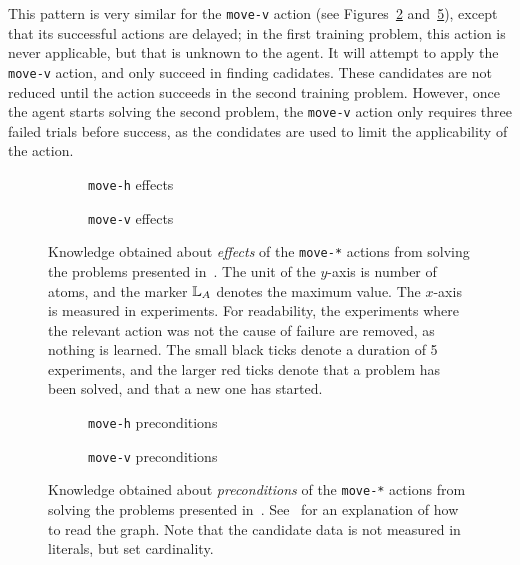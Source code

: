 \documentclass[../Master.tex]{subfiles}
\providecommand{\master}{..}
\begin{document}
This pattern is very similar for the \texttt{move-v} action (see Figures~\ref{fig:res:ekmovev} and~\ref{fig:res:pkmovev}), except that its successful actions are delayed; in the first training problem, this action is never applicable, but that is unknown to the agent. It will attempt to apply the \texttt{move-v} action, and only succeed in finding cadidates. These candidates are not reduced until the action succeeds in the second training problem. However, once the agent starts solving the second problem, the \texttt{move-v} action only requires three failed trials before success, as the condidates are used to limit the applicability of the action.

\begin{figure}
    \centering
    \begin{subfigure}{0.45\linewidth}
        \resizebox{\linewidth}{!}{}
        \caption{\texttt{move-h} effects}\label{fig:res:ekmoveh}
    \end{subfigure}
    \begin{subfigure}{0.45\linewidth}
        \resizebox{\linewidth}{!}{}
        \caption{\texttt{move-v} effects}\label{fig:res:ekmovev}
    \end{subfigure}
    \caption{Knowledge obtained about \emph{effects} of the \texttt{move-*} actions from solving the problems presented in~. The unit of the $y$-axis is number of atoms, and the marker $\mathbb{L}_A$ denotes the maximum value. The $x$-axis is measured in experiments. For readability, the experiments where the relevant action was not the cause of failure are removed, as nothing is learned. The small black ticks denote a duration of 5 experiments, and the larger red ticks denote that a problem has been solved, and that a new one has started.}\label{fig:res:ekmove}
\end{figure}

\begin{figure}
    \centering
    \begin{subfigure}{0.42\linewidth}
        \resizebox{\linewidth}{!}{}
        \caption{\texttt{move-h} preconditions}\label{fig:res:pkmoveh}
    \end{subfigure}
    \begin{subfigure}{0.42\linewidth}
        \resizebox{\linewidth}{!}{}
        \caption{\texttt{move-v} preconditions}\label{fig:res:pkmovev}
    \end{subfigure}
    \caption{Knowledge obtained about \emph{preconditions} of the \texttt{move-*} actions from solving the problems presented in~. See~ for an explanation of how to read the graph. Note that the candidate data is not measured in literals, but set cardinality.}\label{fig:res:pkmove}
\end{figure}
\end{document}
